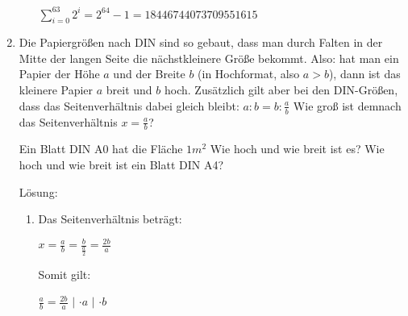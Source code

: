 \documentclass[../main.tex]{subfiles}
\begin{document}
\begin{enumerate}
\begin{enumerate}
		            \begin{math}
			            \sum_{i=0}^{63} 2^i = 2^{64} - 1 = 18446744073709551615
		            \end{math}
	      \end{enumerate}
	\item Die Papiergrößen nach DIN sind so gebaut, dass man durch Falten in der
	      Mitte der langen Seite die nächstkleinere Größe bekommt. Also: hat man ein
	      Papier der  Höhe \begin{math} a \end{math}
	      und der Breite
	      \begin{math}
		      b
	      \end{math}
	      (in Hochformat, also \begin{math}
		      a > b
	      \end{math}),
	      dann ist
	      das kleinere Papier \begin{math}
		      a
	      \end{math} breit und \begin{math}
		      b
	      \end{math} hoch. Zusätzlich gilt aber bei den DIN-Größen,
	      dass das Seitenverhältnis dabei gleich bleibt:
	      \begin{math}
		      a : b = b : \frac{a}{b}
	      \end{math} Wie groß ist demnach das Seitenverhältnis
	      \begin{math}
		      x = \frac{a}{b}
	      \end{math}?

	      Ein Blatt DIN A0 hat die Fläche \begin{math}
		      1 m^2
	      \end{math}
	      Wie hoch und wie breit ist es?
	      Wie hoch und wie breit ist ein Blatt DIN A4?

	      Lösung:
	      \begin{enumerate}
		      \item Das Seitenverhältnis beträgt:

		            \begin{math}
			            x = \frac{a}{b}
			            = \frac{b}{
				            \frac{a}{2}
			            }
			            = \frac{2b}{a}
		            \end{math}

		            Somit gilt:

		            \begin{math}
			            \frac{a}{b} = \frac{2b}{a}
		            \end{math}
		            \(|\)
		            \begin{math}
			            \cdot a
		            \end{math}
		            \(|\)
		            \begin{math}
			            \cdot b
		            \end{math}


\end{enumerate}
\end{enumerate}
\end{document}
